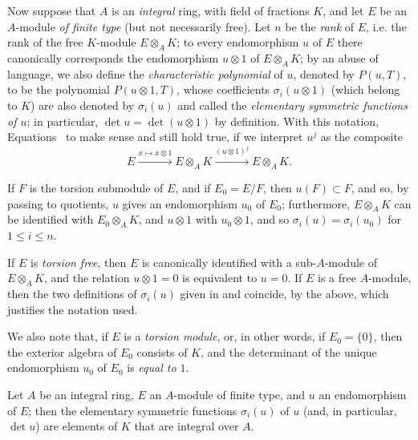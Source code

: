 \begin{env}[6.4.2]
\label{II.6.4.2}
Now suppose that $A$ is an \emph{integral} ring, with field of fractions $K$, and let $E$ be an $A$-module \emph{of finite type} (but not necessarily free).
Let $n$ be the \emph{rank} of $E$, i.e. the rank of the free $K$-module $E\otimes_A K$;
to every endomorphism $u$ of $E$ there canonically corresponds the endomorphism $u\otimes1$ of $E\otimes_A K$;
by an abuse of language, we also define the \emph{characteristic polynomial} of $u$, denoted by $P(u,T)$, to be the polynomial $P(u\otimes1,T)$, whose coefficients $\sigma_i(u\otimes1)$ (which belong to $K$) are also denoted by $\sigma_i(u)$ and called the \emph{elementary symmetric functions of $u$};
in particular, $\det u=\det(u\otimes1)$ by definition.
With this notation, Equations~ to  make sense and still hold true, if we interpret $u^j$ as the composite
\[
  E\xrightarrow{x\mapsto x\otimes1}E\otimes_A K
   \xrightarrow{(u\otimes1)^j}E\otimes_A K.
\]

If $F$ is the torsion submodule of $E$, and if $E_0=E/F$, then $u(F)\subset F$, and so, by passing to quotients, $u$ gives an endomorphism $u_0$ of $E_0$;
furthermore, $E\otimes_A K$ can be identified with $E_0\otimes_A K$, and $u\otimes1$ with $u_0\otimes1$, and so $\sigma_i(u)=\sigma_i(u_0)$ for $1\leq i\leq n$.

If $E$ is \emph{torsion free}, then $E$ is canonically identified with a sub-$A$-module of $E\otimes_A K$, and the relation $u\otimes1=0$ is equivalent to $u=0$.
If $E$ is a free $A$-module, then the two definitions of $\sigma_i(u)$ given in  and  coincide, by the above, which justifies the notation used.

We also note that, if $E$ is a \emph{torsion module}, or, in other words, if $E_0=\{0\}$, then the exterior algebra of $E_0$ consists of $K$, and the determinant of the unique endomorphism $u_0$ of $E_0$ is \emph{equal to $1$}.
\end{env}

\begin{proposition}[6.4.3]
\label{II.6.4.3}
Let $A$ be an integral ring, $E$ an $A$-module of finite type, and $u$ an endomorphism of $E$;
then the elementary symmetric functions $\sigma_i(u)$ of $u$ (and, in particular, $\det u$) are elements of $K$ that are integral over $A$.
\end{proposition}

